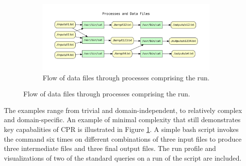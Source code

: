 \begin{figure}[h!]
\begin{subfigure}[b]{1.0\linewidth}
    \end{subfigure}

    \begin{subfigure}[b]{1.0\linewidth}
        \includegraphics[width=\linewidth]{cpr_processes_and_data_files.pdf}
        \setlength{\abovecaptionskip}{-5pt}
        \caption{Flow of data files through processes comprising the run.}
    \end{subfigure}
    
    \label{fig:cpr-example}
\end{figure}
 

The examples range from trivial and domain-independent, to relatively complex and domain-specific. An example of minimal complexity that still demonstrates key capabalities of CPR is illustrated in Figure \ref{fig:cpr-example}. A simple bash script invokes the  command six times on different combinations of three input files to produce three intermediate files and three final output files. The run profile and visualizations of two of the standard queries on a run of the script are included.
